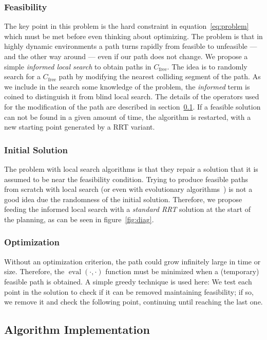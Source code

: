 \subsubsection{Feasibility}
The key point in this problem is the hard constraint in equation~\ref{eq:problem}
which must be met before even thinking about optimizing. The problem is that in
highly dynamic environments a path turns rapidly from feasible to unfeasible
--- and the other way around --- even if our path does not change.
We propose a simple \emph{informed local search} to obtain paths in
\(C_{\text{free}}\).
The idea is to randomly search for a \(C_{\text{free}}\) path by modifying the nearest colliding
segment of the path. As we include in the search some knowledge of the problem,
the \emph{informed} term is coined to distinguish it from blind local search.
The details of the operators used for the modification of the path are described in
section~\ref{sec:implementationrrtlp}. If a feasible solution can not be found in a
given amount of time, the algorithm is restarted, with a new starting point generated by a RRT variant.
\subsubsection{Initial Solution}
The problem with local search algorithms is that they repair a solution that it is
assumed to be near the feasibility condition.
Trying to produce feasible paths from scratch with local search (or even
with evolutionary algorithms~\cite{Xiao97}) is not a good idea due the randomness of the
initial solution. Therefore, we propose feeding the informed local search with a \emph{standard RRT} solution
at the start of the planning, as can be seen in figure~\ref{fig:diag}.
\subsubsection{Optimization}
Without an optimization criterion, the path could grow infinitely large in time or
size. Therefore, the \(\operatorname{eval}(\cdot,\cdot)\) function must be minimized when a
(temporary) feasible path is obtained. A simple greedy technique is used
here: We test each point in the solution to check if it can be removed
maintaining feasibility; if so, we remove it and check the following point,
continuing until reaching the last one.


\subsection{Algorithm Implementation}
\label{sec:implementationrrtlp}

